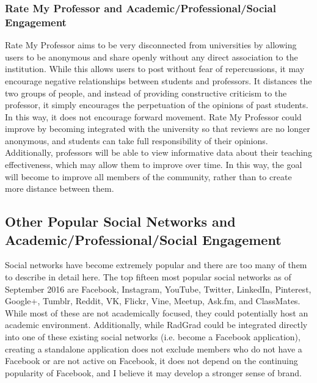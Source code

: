 \subsubsection{Rate My Professor and Academic/Professional/Social Engagement}
Rate My Professor aims to be very disconnected from universities by allowing users to be anonymous and share openly without any direct association to the institution. While this allows users to post without fear of repercussions, it may encourage negative relationships between students and professors. It distances the two groups of people, and instead of providing constructive criticism to the professor, it simply encourages the perpetuation of the opinions of past students. In this way, it does not encourage forward movement. Rate My Professor could improve by becoming integrated with the university so that reviews are no longer anonymous, and students can take full responsibility of their opinions. Additionally, professors will be able to view informative data about their teaching effectiveness, which may allow them to improve over time. In this way, the goal will become to improve all members of the community, rather than to create more distance between them.

\subsection{Other Popular Social Networks and Academic/Professional/Social Engagement}
Social networks have become extremely popular and there are too many of them to describe in detail here. The top fifteen most popular social networks as of September 2016 \cite{Most_Popular_Social_Media} are Facebook, Instagram, YouTube, Twitter, LinkedIn, Pinterest, Google+, Tumblr, Reddit, VK, Flickr, Vine, Meetup, Ask.fm, and ClassMates. While most of these are not academically focused, they could potentially host an academic environment. Additionally, while RadGrad could be integrated directly into one of these existing social networks (i.e. become a Facebook application), creating a standalone application does not exclude members who do not have a Facebook or are not active on Facebook, it does not depend on the continuing popularity of Facebook, and I believe it may develop a stronger sense of brand. 

